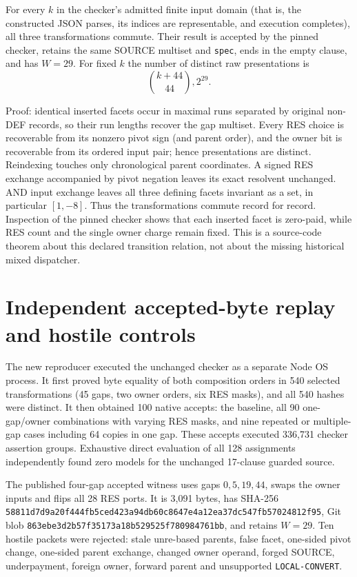 \documentclass[11pt]{article}
\begin{document}
For every $k$ in the checker's admitted finite input domain (that is, the
constructed JSON parses, its indices are representable, and execution
completes), all three transformations commute.  Their result is accepted by
the pinned checker, retains the same SOURCE multiset and \texttt{spec}, ends in
the empty clause, and has $W=29$.  For fixed $k$ the number of distinct raw
presentations is
\[
\boxed{\binom{k+44}{44},2^{29}}.
\]

Proof: identical inserted facets occur in maximal runs separated by original
non-DEF records, so their run lengths recover the gap multiset.  Every RES
choice is recoverable from its nonzero pivot sign (and parent order), and the
owner bit is recoverable from its ordered input pair; hence presentations are
distinct.  Reindexing touches only chronological parent coordinates.  A signed
RES exchange accompanied by pivot negation leaves its exact resolvent
unchanged.  AND input exchange leaves all three defining facets invariant as a
set, in particular $[1,-8]$.  Thus the transformations commute record for
record.  Inspection of the pinned checker shows that each inserted facet is
zero-paid, while RES count and the single owner charge remain fixed.  This is a
source-code theorem about this declared transition relation, not about the
missing historical mixed dispatcher.

\section*{Independent accepted-byte replay and hostile controls}
The new reproducer executed the unchanged checker as a separate Node OS
process.  It first proved byte equality of both composition orders in 540
selected transformations (45 gaps, two owner orders, six RES masks), and all
540 hashes were distinct.  It then obtained 100 native accepts: the baseline,
all 90 one-gap/owner combinations with varying RES masks, and nine repeated or
multiple-gap cases including 64 copies in one gap.  These accepts executed
336,731 checker assertion groups.  Exhaustive direct evaluation of all 128
assignments independently found zero models for the unchanged 17-clause
guarded source.

The published four-gap accepted witness uses gaps $0,5,19,44$, swaps the owner
inputs and flips all 28 RES ports.  It is 3,091 bytes, has SHA-256
\texttt{58811d7d9a20f444fb5ced423a94db60c8647e4a12ea37dc547fb57024812f95},
Git blob \texttt{863ebe3d2b57f35173a18b529525f780984761bb}, and retains $W=29$.
Ten hostile packets were rejected: stale unre-based parents, false facet,
one-sided pivot change, one-sided parent exchange, changed owner operand,
forged SOURCE, underpayment, foreign owner, forward parent and unsupported
\texttt{LOCAL-CONVERT}.
\end{document}

